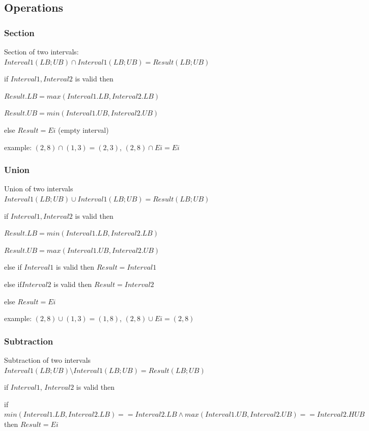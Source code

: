 \subsection{Operations}

\subsubsection{Section}

Section of two intervals: $Interval1(LB;UB) \cap Interval1(LB;UB) = Result(LB;UB)$

if $Interval1, Interval2$ is valid then

$Result.LB=max(Interval1.LB, Interval2.LB)$

$Result.UB=min(Interval1.UB, Interval2.UB)$

else $Result=Ei$ (empty interval)

example: $(2,8)\cap(1,3)=(2,3)$, $(2,8)\cap Ei=Ei$

\subsubsection{Union}

Union of two intervals $Interval1(LB;UB) \cup Interval1(LB;UB) = Result(LB;UB)$

if $Interval1, Interval2$ is valid then

$Result.LB=min(Interval1.LB, Interval2.LB)$

$Result.UB=max(Interval1.UB, Interval2.UB)$

else if $Interval1$ is valid then $Result=Interval1$

else if$ Interval2$ is valid then $Result=Interval2$

else $Result=Ei$

example: $(2,8)\cup(1,3)=(1,8)$, $(2,8)\cup Ei=(2,8)$

\subsubsection{Subtraction}

Subtraction of two intervals $Interval1(LB;UB) \setminus Interval1(LB;UB) = Result(LB;UB)$

if $Interval1$, $Interval2$ is valid then 

if $min(Interval1.LB, Interval2.LB)==Interval2.LB\land max(Interval1.UB, Interval2.UB)==Interval2.HUB$ then 
$Result=Ei$

